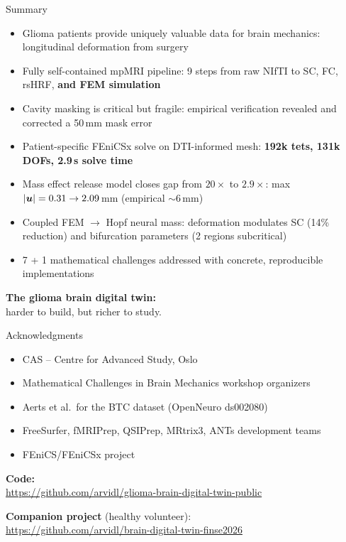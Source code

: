 \begin{frame}{Summary}

  \begin{itemize}
    \item Glioma patients provide \alert{uniquely valuable} data for
      brain mechanics: longitudinal deformation from surgery
    \item Fully self-contained mpMRI pipeline: 9 steps from raw
      NIfTI to SC, FC, rsHRF, \textbf{and FEM simulation}
    \item Cavity masking is critical but fragile: empirical
      verification revealed and corrected a 50\,mm mask error
    \item Patient-specific FEniCSx solve on DTI-informed mesh:
      \textbf{192k tets, 131k DOFs, 2.9\,s solve time}
    \item Mass effect release model closes gap from $20\times$ to
      $2.9\times$: max $|\bm{u}| = 0.31 \to 2.09$\,mm
      (empirical $\sim 6$\,mm)
    \item Coupled FEM $\to$ Hopf neural mass:
      deformation modulates SC (14\% reduction)
      and bifurcation parameters (2 regions subcritical)
    \item 7 + 1 mathematical challenges addressed with concrete,
      reproducible implementations
  \end{itemize}

  \bigskip

  \begin{center}
    \large
    \textbf{The glioma brain digital twin:}\\
    harder to build, but richer to study.
  \end{center}

\end{frame}

\begin{frame}{Acknowledgments}

  \begin{itemize}
    \item CAS -- Centre for Advanced Study, Oslo
    \item Mathematical Challenges in Brain Mechanics workshop organizers
    \item Aerts et al.\ for the BTC dataset (OpenNeuro ds002080)
    \item FreeSurfer, fMRIPrep, QSIPrep, MRtrix3, ANTs development teams
    \item FEniCS/FEniCSx project
  \end{itemize}

  \bigskip

  \textbf{Code:}\\
  \url{https://github.com/arvidl/glioma-brain-digital-twin-public}

  \bigskip

  \textbf{Companion project} (healthy volunteer):\\
  \url{https://github.com/arvidl/brain-digital-twin-finse2026}

\end{frame}
